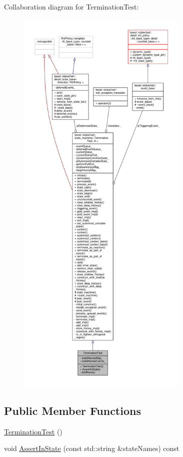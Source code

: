 Collaboration diagram for Termination\+Test\+:
\nopagebreak
\begin{figure}[H]
\begin{center}
\leavevmode
\includegraphics[height=550pt]{struct_termination_test__coll__graph}
\end{center}
\end{figure}
\subsection*{Public Member Functions}
\begin{DoxyCompactItemize}
\item 
\mbox{\hyperlink{struct_termination_test_a2e83202c5a675dfefb03e1854566218b}{Termination\+Test}} ()
\item 
void \mbox{\hyperlink{struct_termination_test_aec947c03a7b1bfbc20a93cc0e7434381}{Assert\+In\+State}} (const std\+::string \&state\+Names) const
\end{DoxyCompactItemize}
